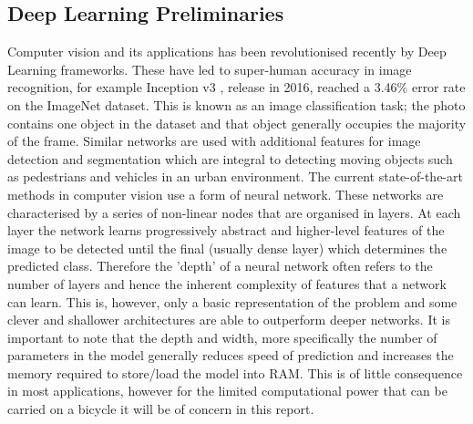 \documentclass[11pt,twoside]{report}
\begin{document}
\subsection{Deep Learning Preliminaries} \label{dlp}
Computer vision and its applications has been revolutionised recently by Deep Learning frameworks. These have led to super-human accuracy in image recognition, for example Inception v3 \cite{Szegedy_2016_CVPR}, release in 2016, reached a 3.46\% error rate on the ImageNet \cite{ILSVRC15} dataset. This is known as an image classification task; the photo contains one object in the dataset and that object generally occupies the majority of the frame. Similar networks are used with additional features for image detection and segmentation which are integral to detecting moving objects such as pedestrians and vehicles in an urban environment.
\newline\newline
The current state-of-the-art methods in computer vision use a form of neural network. These networks are characterised by a series of non-linear nodes that are organised in layers. At each layer the network learns progressively abstract and higher-level features of the image to be detected until the final (usually dense layer) which determines the predicted class. Therefore the 'depth' of a neural network often refers to the number of layers and hence the inherent complexity of features that a network can learn. This is, however, only a basic representation of the problem and some clever and shallower architectures are able to outperform deeper networks. It is important to note that the depth and width, more specifically the number of parameters in the model generally reduces speed of prediction and increases the memory required to store/load the model into RAM. This is of little consequence in most applications, however for the limited computational power that can be carried on a bicycle it will be of concern in this report.
\end{document}
